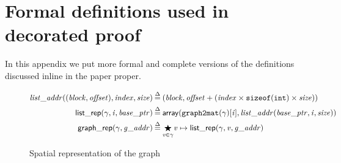 \section{Formal definitions used in decorated proof}

In this appendix we put more formal and complete versions 
of the definitions discussed inline in the paper proper.

\begin{figure}
\begin{equation*}
\begin{split}
\m{list\_addr} ((\m{block}, \m{offset}), \m{index}, \m{size}) &\defeq
  (\m{block}, \m{offset} + (\m{index} \times \texttt{sizeof}(\texttt{int}) \times \m{size})) \\
\p{list\_rep}(\gamma, \m{i}, \m{base\_ptr}) &\defeq \mathsf{array}(\texttt{graph2mat}(\gamma)[\m{i}], \m{list\_addr}(\m{base\_ptr}, \m{i}, \m{size})) \\
\vspace{1em}
\p{graph\_rep}(\gamma, \m{g\_addr}) &\defeq \underset{\m{v} \in \gamma}{\bigstar} \m{v}  \mapsto\p{list\_rep}(\gamma, \m{v}, \m{g\_addr})
\end{split}
\end{equation*}
\caption{Spatial representation of the graph}
\end{figure}

